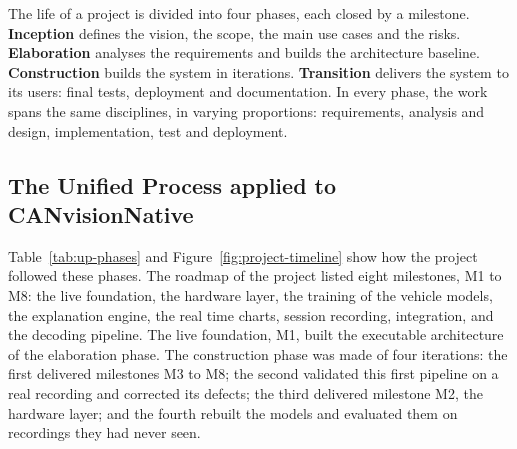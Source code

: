 The life of a project is divided into four phases, each closed by a milestone. \textbf{Inception} defines the vision, the scope, the main use cases and the risks. \textbf{Elaboration} analyses the requirements and builds the architecture baseline. \textbf{Construction} builds the system in iterations. \textbf{Transition} delivers the system to its users: final tests, deployment and documentation. In every phase, the work spans the same disciplines, in varying proportions: requirements, analysis and design, implementation, test and deployment.

\subsection{The Unified Process applied to CANvisionNative}

Table~\ref{tab:up-phases} and Figure~\ref{fig:project-timeline} show how the project followed these phases. The roadmap of the project listed eight milestones, M1 to M8: the live foundation, the hardware layer, the training of the vehicle models, the explanation engine, the real time charts, session recording, integration, and the decoding pipeline. The live foundation, M1, built the executable architecture of the elaboration phase. The construction phase was made of four iterations: the first delivered milestones M3 to M8; the second validated this first pipeline on a real recording and corrected its defects; the third delivered milestone M2, the hardware layer; and the fourth rebuilt the models and evaluated them on recordings they had never seen.

